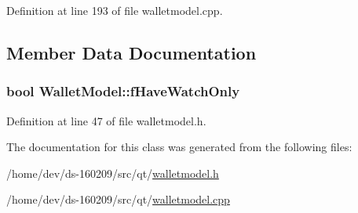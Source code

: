 Definition at line 193 of file walletmodel.\+cpp.



\subsection{Member Data Documentation}
\hypertarget{class_wallet_model_ada7a868b3da256492ea1f19e28374495}{}
\subsubsection[{f\+Have\+Watch\+Only}]{\setlength{\rightskip}{0pt plus 5cm}bool Wallet\+Model\+::f\+Have\+Watch\+Only}\label{class_wallet_model_ada7a868b3da256492ea1f19e28374495}


Definition at line 47 of file walletmodel.\+h.



The documentation for this class was generated from the following files\+:\begin{DoxyCompactItemize}
\item 
/home/dev/ds-\/160209/src/qt/\hyperlink{walletmodel_8h}{walletmodel.\+h}\item 
/home/dev/ds-\/160209/src/qt/\hyperlink{walletmodel_8cpp}{walletmodel.\+cpp}\end{DoxyCompactItemize}
